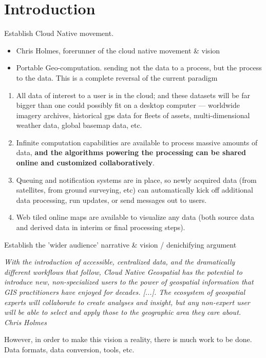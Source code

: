 \chapter{Introduction}

\m{->} Establish Cloud Native movement.

\begin{itemize}
  \item Chris Holmes, forerunner of the cloud native movement \& vision
  \item Portable Geo-computation. sending not the data to a process, but the process to the data. This is a complete reversal of the current paradigm
\end{itemize}


\begin{enumerate}
  \item     All data of interest to a user is in the cloud; and these datasets will be far bigger than one could possibly fit on a desktop computer — worldwide imagery archives, historical gps data for fleets of assets, multi-dimensional weather data, global basemap data, etc.
  \item     Infinite computation capabilities are available to process massive amounts of data, \textbf{and the algorithms powering the processing can be shared online and customized collaboratively}.
  \item     Queuing and notification systems are in place, so newly acquired data (from satellites, from ground surveying, etc) can automatically kick off additional data processing, run updates, or send messages out to users.
  \item     Web tiled online maps are available to visualize any data (both source data and derived data in interim or final processing steps).
\end{enumerate}


\m{->} Establish the 'wider audience' narrative \& vision / denichifying argument

\emph{
  With the introduction of accessible, centralized data, and the dramatically different workflows that follow, Cloud Native Geospatial has the potential to introduce new, non-specialized users to the power of geospatial information that GIS practitioners have enjoyed for decades. [...]. The ecosystem of geospatial experts will collaborate to create analyses and insight, but any non-expert user will be able to select and apply those to the geographic area they care about. ~ Chris Holmes
}

\m{->} However, in order to make this vision a reality, there is much work to be done. Data formats, data conversion, tools, etc. 

